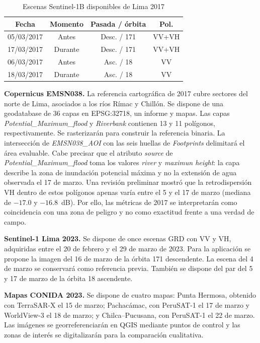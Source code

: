 \documentclass[conference]{IEEEtran}
\begin{document}
\begin{table}[!t]
\centering
\caption{Escenas Sentinel-1B disponibles de Lima 2017}
\label{tab:escenas2017}
\footnotesize
\renewcommand{\arraystretch}{1.2}
\setlength{\tabcolsep}{3pt}
\begin{tabular}{cccc}
\hline
\textbf{Fecha} &
\textbf{Momento} &
\textbf{Pasada / órbita} &
\textbf{Pol.} \\
\hline
05/03/2017 & Antes   & Desc. / 171 & VV+VH \\
17/03/2017 & Durante & Desc. / 171 & VV+VH \\
06/03/2017 & Antes   & Asc. / 18   & VV \\
18/03/2017 & Durante & Asc. / 18   & VV \\
\hline
\end{tabular}
\end{table}

\textbf{Copernicus EMSN038.}
La referencia cartográfica de 2017 cubre sectores
del norte de Lima, asociados a los ríos Rímac
y Chillón. Se dispone de una geodatabase de
36 capas en EPSG:32718, un informe y mapas.
Las capas \textit{Potential\_Maximum\_flood}
y \textit{Riverbank} contienen 13 y 11 polígonos,
respectivamente. Se rasterizarán para construir
la referencia binaria. La intersección de
\textit{EMSN038\_AOI} con las seis huellas
de \textit{Footprints} delimitará el área evaluable.
Cabe precisar que el atributo \textit{source}
de \textit{Potential\_Maximum\_flood} toma los
valores \textit{river} y \textit{maximun height}:
la capa describe la zona de inundación potencial
máxima y no la extensión de agua observada el
17 de marzo. Una revisión preliminar mostró que
la retrodispersión VH dentro de estos polígonos
apenas varía entre el 5 y el 17 de marzo
(mediana de $-17.0$ y $-16.8$~dB).
Por ello, las métricas de 2017 se interpretarán
como coincidencia con una zona de peligro y no
como exactitud frente a una verdad de campo.

\textbf{Sentinel-1 Lima 2023.}
Se dispone de once escenas GRD con VV y VH,
adquiridas entre el 20 de febrero y el
29 de marzo de 2023. Para la aplicación se propone
la imagen del 16 de marzo de la órbita 171
descendente. La escena del 4 de marzo se
conservará como referencia previa. También
se dispone del par del 5 y 17 de marzo de
la órbita 18 ascendente.

\textbf{Mapas CONIDA 2023.}
Se dispone de cuatro mapas: Punta Hermosa,
obtenido con TerraSAR-X el 15 de marzo;
Pachacámac, con PeruSAT-1 el 17 de marzo
y WorldView-3 el 18 de marzo; y
Chilca--Pucusana, con PeruSAT-1 el 22 de marzo.
Las imágenes se georreferenciarán en QGIS
mediante puntos de control y las zonas de
interés se digitalizarán para la comparación
cualitativa.
\end{document}
